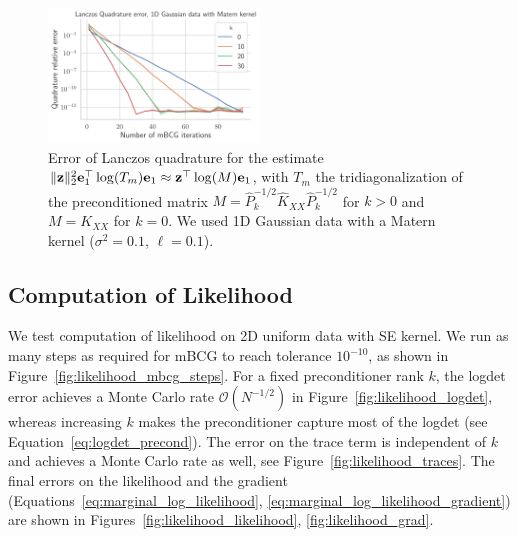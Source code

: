 \documentclass{article}
\begin{document}
{\begin{figure}
    \centering
    \includegraphics[width=0.5\textwidth]{report/res/quadrature_1d_gaussian_matern.pdf}
    \caption{Error of Lanczos quadrature for the estimate $\Vert \boldsymbol{\mathbf{z}} \Vert_2^2 \boldsymbol{\mathbf{e}}_1^\top \log(T_m) \boldsymbol{\mathbf{e}}_1 \approx \boldsymbol{\mathbf{z}}^\top \log(M) \boldsymbol{\mathbf{e}}_1$, with $T_m$ the tridiagonalization of the preconditioned matrix $M = \widehat P_k^{-1/2} \widehat K_{XX} \widehat P_k^{-1/2}$ for $k > 0$ and $M = K_{XX}$ for $k=0$. We used 1D Gaussian data with a Matern kernel ($\sigma^2 = 0.1$, $\ell = 0.1$).}
    \label{fig:quadrature}
\end{figure}


\subsection{Computation of Likelihood}

We test computation of likelihood on 2D uniform data with SE kernel. We run as many steps as required for mBCG to reach tolerance $10^{-10}$, as shown in Figure~\ref{fig:likelihood_mbcg_steps}. For a fixed preconditioner rank $k$, the logdet error achieves a Monte Carlo rate $\mathcal O(N^{-1/2})$ in Figure~\ref{fig:likelihood_logdet}, whereas increasing $k$ makes the preconditioner capture most of the logdet (see Equation~\ref{eq:logdet_precond}). The error on the trace term is independent of $k$ and achieves a Monte Carlo rate as well, see Figure~\ref{fig:likelihood_traces}. The final errors on the likelihood and the gradient (Equations~\ref{eq:marginal_log_likelihood}, \ref{eq:marginal_log_likelihood_gradient}) are shown in Figures~\ref{fig:likelihood_likelihood}, \ref{fig:likelihood_grad}.


}
\end{document}
